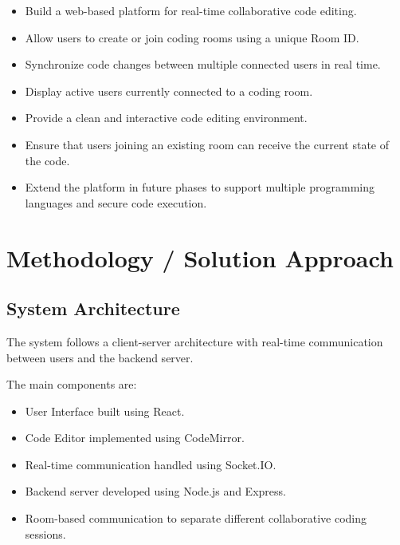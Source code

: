 \documentclass[11pt,letterpaper]{article}
\begin{document}
\begin{itemize}
    \item Build a web-based platform for real-time collaborative code editing.
    
    \item Allow users to create or join coding rooms using a unique Room ID.
    
    \item Synchronize code changes between multiple connected users in real time.
    
    \item Display active users currently connected to a coding room.
    
    \item Provide a clean and interactive code editing environment.
    
    \item Ensure that users joining an existing room can receive the current state of the code.
    
    \item Extend the platform in future phases to support multiple programming languages and secure code execution.
\end{itemize}





\section{Methodology / Solution Approach}

\subsection{System Architecture}

The system follows a client-server architecture with real-time communication between users and the backend server.

The main components are:

\begin{itemize}
    \item User Interface built using React.
    
    \item Code Editor implemented using CodeMirror.
    
    \item Real-time communication handled using Socket.IO.
    
    \item Backend server developed using Node.js and Express.
    
    \item Room-based communication to separate different collaborative coding sessions.
\end{itemize}
\end{document}
